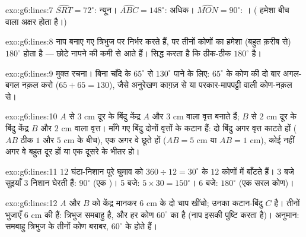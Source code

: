 \begin{solution}{exo:g6:lines:7}
$\widehat{SRT} = 72^\circ$: न्यून। \quad
$\widehat{ABC} = 148^\circ$: अधिक। \quad
$\widehat{MON} = 90^\circ$: । ( हमेशा बीच वाला
अक्षर होता है।)
\end{solution}

\begin{solution}{exo:g6:lines:8}
नाप बनाए गए त्रिभुज पर निर्भर करते हैं, पर तीनों कोणों का 
हमेशा (बहुत क़रीब से) $180^\circ$ होता है --- छोटे  नापने की
कमी से आते हैं।  सिद्ध करता है कि 
ठीक-ठीक $180^\circ$ है।
\end{solution}

\begin{solution}{exo:g6:lines:9}
मुक्त रचना। बिना चाँदे के $65^\circ$ से $130^\circ$ पाने के लिए:
$65^\circ$ के कोण की दो बार अगल-बगल नक़ल करो ($65 + 65 =
130$), जैसे अनुरेखण काग़ज़ से या परकार-मापपट्टी वाली कोण-नक़ल से।
\end{solution}

\begin{solution}{exo:g6:lines:10}
$A$ से $3$ cm दूर के बिंदु केंद्र $A$ और  $3$ cm वाला
वृत्त बनाते हैं; $B$ से $2$ cm दूर के बिंदु केंद्र $B$ और
 $2$ cm वाला वृत्त। माँगे गए बिंदु दोनों वृत्तों के
कटान हैं: दो बिंदु अगर वृत्त काटते हों ($AB$ ठीक $1$ और
$5$ cm के बीच), एक अगर वे छूते हों ($AB = 5$ cm या $AB = 1$ cm),
कोई नहीं अगर वे बहुत दूर हों या एक दूसरे के भीतर हो।
\end{solution}

\begin{solution}{exo:g6:lines:11}
$12$ घंटा-निशान पूरे घुमाव को $360 \div 12 = 30^\circ$ के
$12$ कोणों में बाँटते हैं। 3 बजे सुइयाँ $3$ निशान घेरती हैं:
$90^\circ$ (एक )। 5 बजे: $5 \times 30 = 150^\circ$।
6 बजे: $180^\circ$ (एक सरल कोण)।
\end{solution}

\begin{solution}{exo:g6:lines:12}
$A$ और $B$ को केंद्र मानकर $6$ cm  के दो चाप खींचो; उनका
कटान-बिंदु $C$ है। तीनों भुजाएँ $6$ cm की हैं: त्रिभुज समबाहु
है, और हर कोण $60^\circ$ का है (नाप इसकी पुष्टि करता है)।
अनुमान: समबाहु त्रिभुज के तीनों कोण बराबर, $60^\circ$ के होते
हैं।
\end{solution}

